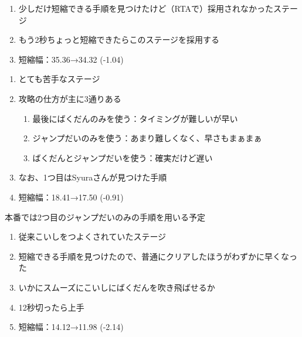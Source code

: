 \begin{enumerate}[label={\sarrow}]
\item 少しだけ短縮できる手順を見つけたけど（RTAで）採用されなかったステージ
\item もう2秒ちょっと短縮できたらこのステージを採用する
\item 短縮幅：35.36→34.32 (-1.04)
\end{enumerate}



\begin{enumerate}[label={\sarrow}]
\item とても苦手なステージ
\item 攻略の仕方が主に3通りある
  \begin{enumerate}[label={\sarrow}]
  \item 最後にばくだんのみを使う：タイミングが難しいが早い
  \item ジャンプだいのみを使う：あまり難しくなく、早さもまぁまぁ
  \item ばくだんとジャンプだいを使う：確実だけど遅い
  \end{enumerate}
\item なお、1つ目はSyuraさんが見つけた手順
\item 短縮幅：18.41→17.50 (-0.91)
\end{enumerate}
\begin{marker}
本番では2つ目のジャンプだいのみの手順を用いる予定
\end{marker}



\clearpage
\begin{enumerate}[label={\sarrow}]
\item 従来こいしをつよくされていたステージ
\item 短縮できる手順を見つけたので、普通にクリアしたほうがわずかに早くなった
\item いかにスムーズにこいしにばくだんを吹き飛ばせるか
\item 12秒切ったら上手
\item 短縮幅：14.12→11.98 (-2.14)
\end{enumerate}



